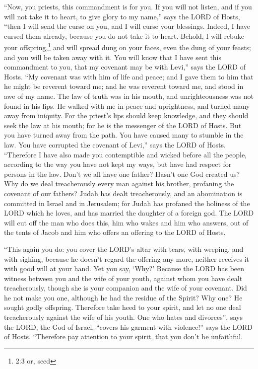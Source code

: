 \mychapter{} \myverse*{}“Now, you priests, this commandment is for you. \myverse{}If you will not listen, and if you will not take it to heart, to give glory to my name,” says the LORD of Hosts, “then I will send the curse on you, and I will curse your blessings. Indeed, I have cursed them already, because you do not take it to heart. \myverse{}Behold, I will rebuke your offspring,\footnote{2:3 or, seed} and will spread dung on your faces, even the dung of your feasts; and you will be taken away with it. \myverse{}You will know that I have sent this commandment to you, that my covenant may be with Levi,” says the LORD of Hosts. \myverse{}“My covenant was with him of life and peace; and I gave them to him that he might be reverent toward me; and he was reverent toward me, and stood in awe of my name. \myverse{}The law of truth was in his mouth, and unrighteousness was not found in his lips. He walked with me in peace and uprightness, and turned many away from iniquity. \myverse{}For the priest’s lips should keep knowledge, and they should seek the law at his mouth; for he is the messenger of the LORD of Hosts. \myverse{}But you have turned away from the path. You have caused many to stumble in the law. You have corrupted the covenant of Levi,” says the LORD of Hosts. \myverse{}“Therefore I have also made you contemptible and wicked before all the people, according to the way you have not kept my ways, but have had respect for persons in the law. \myverse{}Don’t we all have one father? Hasn’t one God created us? Why do we deal treacherously every man against his brother, profaning the covenant of our fathers? \myverse{}Judah has dealt treacherously, and an abomination is committed in Israel and in Jerusalem; for Judah has profaned the holiness of the LORD which he loves, and has married the daughter of a foreign god. \myverse{}The LORD will cut off the man who does this, him who wakes and him who answers, out of the tents of Jacob and him who offers an offering to the LORD of Hosts.


\myverse{}“This again you do: you cover the LORD’s altar with tears, with weeping, and with sighing, because he doesn’t regard the offering any more, neither receives it with good will at your hand. \myverse{}Yet you say, ‘Why?’ Because the LORD has been witness between you and the wife of your youth, against whom you have dealt treacherously, though she is your companion and the wife of your covenant. \myverse{}Did he not make you one, although he had the residue of the Spirit? Why one? He sought godly offspring. Therefore take heed to your spirit, and let no one deal treacherously against the wife of his youth. \myverse{}One who hates and divorces”, says the LORD, the God of Israel, “covers his garment with violence!” says the LORD of Hosts. “Therefore pay attention to your spirit, that you don’t be unfaithful.


